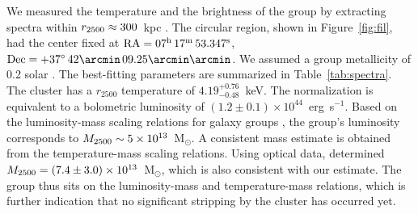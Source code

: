 We measured the temperature and the brightness of the group by extracting spectra within $r_{\rm 2500} \approx 300$~kpc \citep{Medezinski2013}. The circular region, shown in Figure~\ref{fig:fil}, had the center fixed at ${\rm RA} = 07^{\rm h}\, 17^{\rm m}\, 53.347^{\rm s}$, ${\rm Dec} = +37^{\circ}\, 42\arcmin \, 09.25\arcmin\arcmin$. We assumed a group metallicity of 0.2 solar \citep[e.g.,][]{Rasmussen2007}. The best-fitting parameters are summarized in Table~\ref{tab:spectra}. The cluster has a $r_{2500}$ temperature of $4.19_{-0.48}^{+0.76}$~keV. The normalization is equivalent to a bolometric luminosity of $(1.2\pm 0.1) \times 10^{44}$~erg~s$^{-1}$. Based on the luminosity-mass scaling relations for galaxy groups \citep[e.g.,][]{Connor2014}, the group's luminosity corresponds to $M_{\rm 2500} \sim 5\times 10^{13}$~M$_\odot$. A consistent mass estimate is obtained from the temperature-mass scaling relations.  Using optical data, \citet{Medezinski2013} determined $M_{\rm 2500} = (7.4\pm 3.0) \times 10^{13}$~M$_\odot$, which is also consistent with our estimate. The group thus sits on the luminosity-mass and temperature-mass relations, which is further indication that no significant stripping by the cluster has occurred yet.
